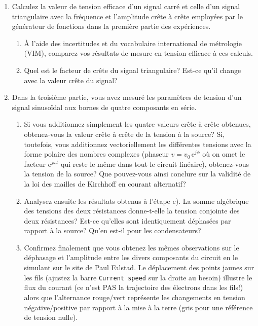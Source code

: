 \documentclass[canadien,12pt,oneside,letterpaper]{article}
\begin{document}
\begin{enumerate}
        \item Calculez la valeur de tension efficace d'un signal carré et celle d'un signal triangulaire avec la fréquence et l'amplitude crête à crête employées par le générateur de fonctions dans la première partie des expériences. 
    \begin{enumerate}
        \item À l'aide des incertitudes et du vocabulaire international de métrologie (VIM), comparez vos résultats de mesure en tension efficace à ces calculs.
        \item Quel est le facteur de crête du signal triangulaire? Est-ce qu'il change avec la valeur crête du signal?
    \end{enumerate}
    \item Dans la troisième partie, vous avez mesuré les paramètres de tension d'un signal sinusoïdal aux bornes de quatre composants en série.
    \begin{enumerate}
        \item Si vous additionnez simplement les quatre valeurs crête à crête obtenues, obtenez-vous la valeur crête à crête de la tension à la source? Si, toutefois, vous additionnez vectoriellement les différentes tensions avec la forme polaire des nombres complexes (phaseur $v=v_0\,\textrm{e}^{j\phi}$ où on omet le facteur $\textrm{e}^{j\omega t}$ qui reste le même dans tout le circuit linéaire), obtenez-vous la tension de la source? Que pouvez-vous ainsi conclure sur la validité de la loi des mailles de Kirchhoff en courant alternatif?
        \item Analysez ensuite les résultats obtenus à l'étape c). La somme algébrique des tensions des deux résistances donne-t-elle la tension conjointe des deux résistances? Est-ce qu'elles sont identiquement déphasées par rapport à la source? Qu'en est-il pour les condensateurs?
        \item Confirmez finalement que vous obtenez les mêmes observations sur le déphasage et l'amplitude entre les divers composants du circuit en le simulant sur le site de Paul Falstad. Le déplacement des points jaunes sur les fils (ajustez la barre \texttt{Current speed} sur la droite au besoin) illustre le flux du courant (ce n'est PAS la trajectoire des électrons dans les fils!) alors que l'alternance rouge/vert représente les changements en tension négative/positive par rapport à la mise à la terre (gris pour une référence de tension nulle).\par

\end{enumerate}
\end{enumerate}
\end{document}
